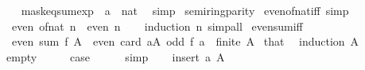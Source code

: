\begin{isabellebody}
%
\isadelimproof
\ \ %
\endisadelimproof
%
\isatagproof
{}\isamarkupfalse%
\ mask{\isacharunderscore}{\kern0pt}eq{\isacharunderscore}{\kern0pt}sum{\isacharunderscore}{\kern0pt}exp\ {\isacharbrackleft}{\kern0pt}\ {\isacharquery}{\kern0pt}{\isacharprime}{\kern0pt}a\ {\isacharequal}{\kern0pt}\ nat{\isacharbrackright}{\kern0pt}\ \isamarkupfalse%
\ simp%
\endisatagproof
{\isafoldproof}%
%
\isadelimproof
\isanewline
%
\endisadelimproof
\isanewline
{}\isamarkupfalse%
\ semiring{\isacharunderscore}{\kern0pt}parity\isanewline
{}\isanewline
\isanewline
{}\isamarkupfalse%
\ even{\isacharunderscore}{\kern0pt}of{\isacharunderscore}{\kern0pt}nat{\isacharunderscore}{\kern0pt}iff\ {\isacharbrackleft}{\kern0pt}simp{\isacharbrackright}{\kern0pt}{\isacharcolon}{\kern0pt}\isanewline
\ \ {\isachardoublequoteopen}even\ {\isacharparenleft}{\kern0pt}of{\isacharunderscore}{\kern0pt}nat\ n{\isacharparenright}{\kern0pt}\ {\isasymlongleftrightarrow}\ even\ n{\isachardoublequoteclose}\isanewline
%
\isadelimproof
\ \ %
\endisadelimproof
%
\isatagproof
{}\isamarkupfalse%
\ {\isacharparenleft}{\kern0pt}induction\ n{\isacharparenright}{\kern0pt}\ simp{\isacharunderscore}{\kern0pt}all%
\endisatagproof
{\isafoldproof}%
%
\isadelimproof
\isanewline
%
\endisadelimproof
\isanewline
{}\isamarkupfalse%
\ even{\isacharunderscore}{\kern0pt}sum{\isacharunderscore}{\kern0pt}iff{\isacharcolon}{\kern0pt}\isanewline
\ \ {\isacartoucheopen}even\ {\isacharparenleft}{\kern0pt}sum\ f\ A{\isacharparenright}{\kern0pt}\ {\isasymlongleftrightarrow}\ even\ {\isacharparenleft}{\kern0pt}card\ {\isacharbraceleft}{\kern0pt}a{\isasymin}A{\isachardot}{\kern0pt}\ odd\ {\isacharparenleft}{\kern0pt}f\ a{\isacharparenright}{\kern0pt}{\isacharbraceright}{\kern0pt}{\isacharparenright}{\kern0pt}{\isacartoucheclose}\ \ {\isacartoucheopen}finite\ A{\isacartoucheclose}\isanewline
%
\isadelimproof
%
\endisadelimproof
%
\isatagproof
{}\isamarkupfalse%
\ that\ \isamarkupfalse%
\ {\isacharparenleft}{\kern0pt}induction\ A{\isacharparenright}{\kern0pt}\isanewline
\ \ \isamarkupfalse%
\ empty\isanewline
\ \ \isamarkupfalse%
\ \isamarkupfalse%
\ {\isacharquery}{\kern0pt}case\isanewline
\ \ \ \ \isamarkupfalse%
\ simp\isanewline
{}\isamarkupfalse%
\isanewline
\ \ \isamarkupfalse%
\ {\isacharparenleft}{\kern0pt}insert\ a\ A{\isacharparenright}{\kern0pt}\isanewline

\end{isabellebody}
